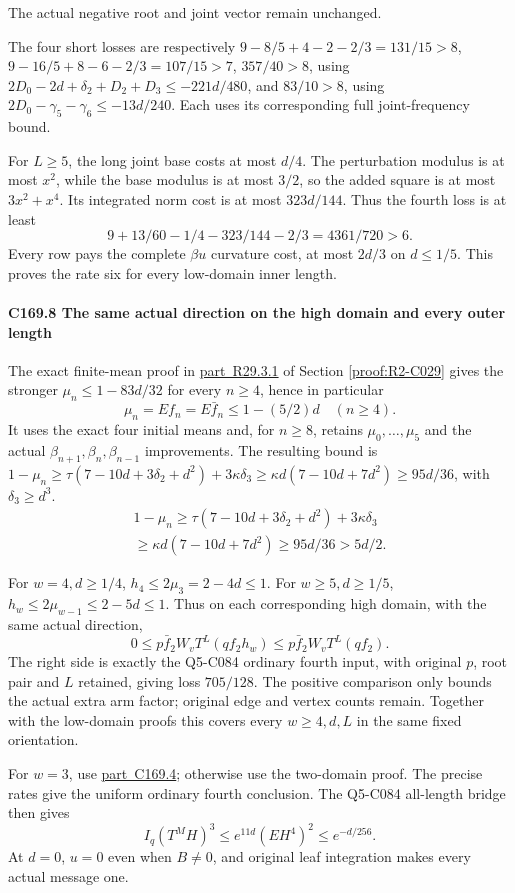 The actual negative root and joint vector remain unchanged.

The four short losses are respectively \(9-8/5+4-2-2/3=131/15>8\), \(9-16/5+8-6-2/3=107/15>7\), \(357/40>8\), using \(2D_0-2d+\delta_2+D_2+D_3\le-221d/480\), and \(83/10>8\), using \(2D_0-\gamma_5-\gamma_6\le-13d/240\). Each uses its corresponding full joint-frequency bound.

For \(L\ge5\), the long joint base costs at most \(d/4\). The perturbation modulus is at most \(x^2\), while the base modulus is at most \(3/2\), so the added square is at most \(3x^2+x^4\). Its integrated norm cost is at most \(323d/144\). Thus the fourth loss is at least
\[
9+13/60-1/4-323/144-2/3=4361/720>6.                       \tag{C169.7.5}
\]
Every row pays the complete \(\beta u\) curvature cost, at most \(2d/3\) on \(d\le1/5\). This proves the rate six for every low-domain inner length.

\paragraph{C169.8 The same actual direction on the high domain and every outer length}

The exact finite-mean proof in \mbox{\hyperref[part:R29.3.1]{part R29.3.1}} of Section \ref{proof:R2-C029} gives the stronger \(\mu_n\le1-83d/32\) for every \(n\ge4\), hence in particular
\[
\mu_n=Ef_n=E\bar f_n\le1-(5/2)d\quad(n\ge4).                 \tag{C169.8.1}
\]
It uses the exact four initial means and, for \(n\ge8\), retains \(\mu_0,\allowbreak \allowbreak  \ldots,\allowbreak \allowbreak  \mu_5\) and the actual \(\beta_{n+1},\allowbreak \allowbreak  \beta_n,\allowbreak \allowbreak  \beta_{n-1}\) improvements. The resulting bound is \(1-\mu_n\ge\tau(7-10d+3\delta_2+d^2)+3\kappa \delta_3\ge\kappa d(7-10d+7d^2)\ge95d/36\), with \(\delta_3\ge d^3\). 
\[
\begin{gathered}
1-\mu_n\ge\tau(7-10d+3\delta_2+d^2)+3\kappa \delta_3\\
\ge\kappa d(7-10d+7d^2)\ge95d/36>5d/2.
\end{gathered}
\]


For \(w=4,\allowbreak \allowbreak  d\ge1/4\), \(h_4\le2\mu_3=2-4d\le1\). For \(w\ge5,\allowbreak \allowbreak  d\ge1/5\), \(h_w\le2\mu_{w-1}\le2-5d\le1\). Thus on each corresponding high domain, with the same actual direction,
\[
0\le p \bar f_2W_v T^L(qf_2h_w)\le p \bar f_2W_v T^L(qf_2).         \tag{C169.8.2}
\]
The right side is exactly the Q5-C084 ordinary fourth input, with original \(p\), root pair and \(L\) retained, giving loss \(705/128\). The positive comparison only bounds the actual extra arm factor; original edge and vertex counts remain. Together with the low-domain proofs this covers every \(w\ge4,\allowbreak \allowbreak  d,\allowbreak \allowbreak  L\) in the same fixed orientation.

For \(w=3\), use \mbox{\hyperref[part:C169.4]{part C169.4}}; otherwise use the two-domain proof. The precise rates give the uniform ordinary fourth conclusion. The Q5-C084 all-length bridge then gives
\[
I_q(T^MH)^3\le e^{11d}(EH^4)^2\le e^{-d/256}.             \tag{C169.8.3}
\]
At \(d=0\), \(u=0\) even when \(B\ne0\), and original leaf integration makes every actual message one.
